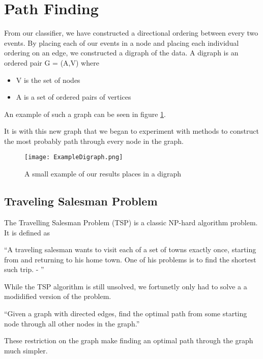 \documentclass[bsc,frontabs,twoside,singlespacing,parskip,deptreport]{infthesis}     %
\begin{document}
\section{Path Finding} \label{chapter:graphing}
From our classifier, we have constructed a directional ordering between every two events.
By placing each of our events in a node and placing each individual ordering on an edge, we constructed
a digraph of the data.
A digraph is an ordered pair G = (A,V) where\cite{bang2008digraphs}
\begin{itemize}
  \item V is the set of nodes
  \item A is a set of ordered pairs of vertices
\end{itemize}
An example of such a graph can be seen in figure \ref{fig:digraph}.

It is with this new graph that we began to experiment with methods to construct the most probably path through every
node in the graph.


\begin{figure}
  \centering
  \texttt{[image: ExampleDigraph.png]}
  \caption{A small example of our results places in a digraph}
  \label{fig:digraph}
 \end{figure}

\subsection{Traveling Salesman Problem}
The Travelling Salesman Problem (TSP) is a classic NP-hard algorithm problem\cite{junger1995traveling}.%
It is defined as
\begin{center}
\enquote{A traveling salesman wants to visit each of a set of towns exactly once, starting
from and returning to his home town. One of his problems is to find the shortest
such trip. - \cite{junger1995traveling}}
\end{center}

While the TSP algorithm is still unsolved, we fortunetly only had to solve a a modidified version of the problem.\\

\begin{center}
  \enquote{Given a graph with directed edges, find the optimal path from some starting node through all other nodes in
  the graph.}
\end{center}

These restriction on the graph make finding an optimal path through the graph much simpler.
\end{document}
